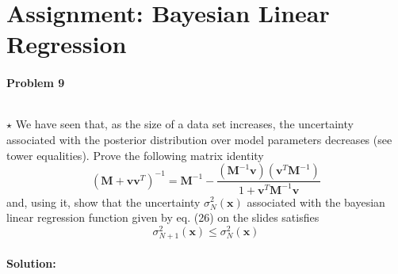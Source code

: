 \documentclass{article}
\renewcommand{\Vec}[1]{\ensuremath{\mathbf{#1}}}
\newcommand{\Mtx}[1]{\ensuremath{\mathbf{#1}}}
\begin{document}
\section{Assignment: Bayesian Linear Regression }
\paragraph*{Problem 9}
$\;$ 

$\star$ 
We have seen that, as the size of a data set increases, the uncertainty
associated with the posterior distribution over model parameters decreases (see 
tower equalities). Prove the following matrix identity
\[
(\Mtx{M} + \Vec{v}\Vec{v}^T)^{-1} = \Mtx{M}^{-1} - 
\frac{(\Mtx{M}^{-1}\Vec{v})(\Vec{v}^T\Mtx{M}^{-1})}{1 + \Vec{v}^T\Mtx{M}^{-1}\Vec{v}}
\]
and, using it, show that the uncertainty $\sigma_N^2(\Vec{x})$ associated
with the bayesian linear regression function given by eq. (26) on the slides satisfies
\begin{equation}
\sigma_{N+1}^2(\Vec{x}) \leq \sigma_N^2(\Vec{x})
\label{eq:varred}
\end{equation}

\paragraph*{Solution:}
\end{document}
